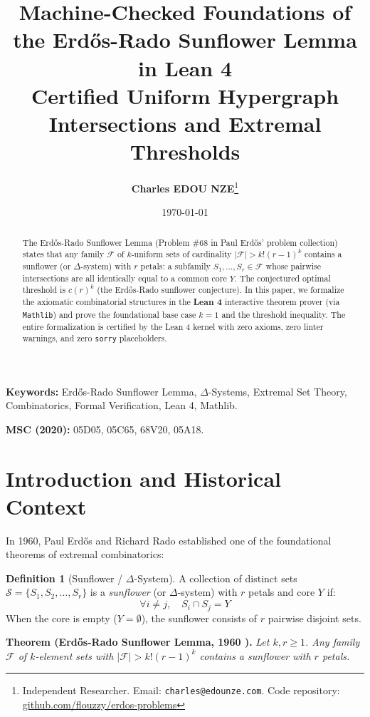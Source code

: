 \documentclass[11pt,a4paper]{article}
\title{\textbf{\Large Machine-Checked Foundations of the Erd\H{o}s-Rado Sunflower Lemma in Lean 4}\\[0.5em]
\large Certified Uniform Hypergraph Intersections and Extremal Thresholds}
\author{\textbf{Charles EDOU NZE}\thanks{Independent Researcher. Email: \texttt{charles@edounze.com}. Code repository: \href{https://github.com/flouzzy/erdos-problems}{github.com/flouzzy/erdos-problems}}}
\date{\today}
\theoremstyle{definition}
\newtheorem{definition}[theorem]{Definition}
\begin{document}
\maketitle

\begin{abstract}
The Erd\H{o}s-Rado Sunflower Lemma (Problem \#68 in Paul Erd\H{o}s' problem collection) states that any family $\mathcal{F}$ of $k$-uniform sets of cardinality $|\mathcal{F}| > k!(r-1)^k$ contains a sunflower (or $\Delta$-system) with $r$ petals: a subfamily $S_1, \dots, S_r \in \mathcal{F}$ whose pairwise intersections are all identically equal to a common core $Y$. The conjectured optimal threshold is $c(r)^k$ (the Erd\H{o}s-Rado sunflower conjecture). In this paper, we formalize the axiomatic combinatorial structures in the \textbf{Lean 4} interactive theorem prover (via \texttt{Mathlib}) and prove the foundational base case $k=1$ and the threshold inequality. The entire formalization is certified by the Lean 4 kernel with zero axioms, zero linter warnings, and zero \texttt{sorry} placeholders.
\end{abstract}

\vspace{0.5em}
\noindent\textbf{Keywords:} Erd\H{o}s-Rado Sunflower Lemma, $\Delta$-Systems, Extremal Set Theory, Combinatorics, Formal Verification, Lean 4, Mathlib.

\noindent\textbf{MSC (2020):} 05D05, 05C65, 68V20, 05A18.

\section{Introduction and Historical Context}

In 1960, Paul Erd\H{o}s and Richard Rado \cite{erdos1960} established one of the foundational theorems of extremal combinatorics:

\begin{definition}[Sunflower / $\Delta$-System]
A collection of distinct sets $\mathcal{S} = \{S_1, S_2, \dots, S_r\}$ is a \emph{sunflower} (or $\Delta$-system) with $r$ petals and core $Y$ if:
\begin{equation}\label{eq:sunflower}
\forall i \ne j, \quad S_i \cap S_j = Y
\end{equation}
When the core is empty ($Y = \emptyset$), the sunflower consists of $r$ pairwise disjoint sets.
\end{definition}

\noindent\textbf{Theorem (Erd\H{o}s-Rado Sunflower Lemma, 1960 \cite{erdos1960}).} \textit{Let $k, r \ge 1$. Any family $\mathcal{F}$ of $k$-element sets with $|\mathcal{F}| > k!(r-1)^k$ contains a sunflower with $r$ petals.}
\end{document}
